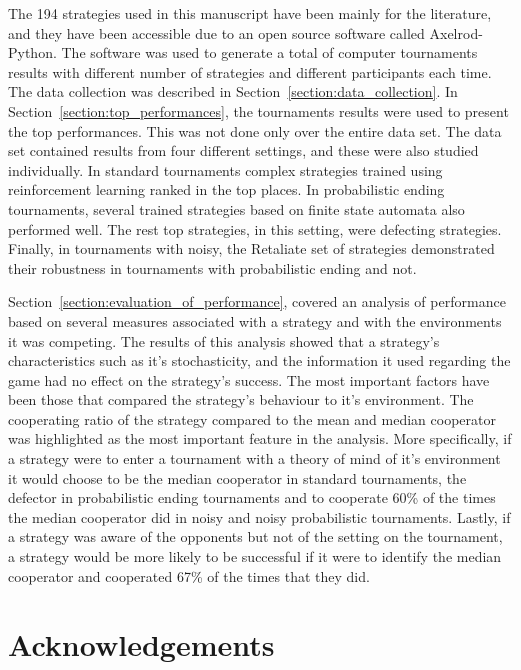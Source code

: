 \documentclass{article}
\newcommand{\numberofalltournaments}{}
\begin{document}
The 194 strategies used in this manuscript have been mainly for the literature,
and they have been accessible due to an open source software called
Axelrod-Python. The software was used to generate a total of
\numberofalltournaments computer tournaments results with different number of
strategies and different participants each time. The data collection was
described in Section~\ref{section:data_collection}. In
Section~\ref{section:top_performances}, the tournaments results were used to
present the top performances. This was not done only over the entire data set.
The data set contained results from four different settings, and these were also
studied individually. In standard tournaments complex strategies trained using
reinforcement learning ranked in the top places. In probabilistic ending
tournaments, several trained strategies based on finite state automata also
performed well. The rest top strategies, in this setting, were defecting
strategies. Finally, in tournaments with noisy, the Retaliate set of strategies
demonstrated their robustness in tournaments with probabilistic ending and not.

Section~\ref{section:evaluation_of_performance}, covered an analysis of
performance based on several measures associated with a strategy and with the
environments it was competing. The results of this analysis showed that a
strategy's characteristics such as it's stochasticity, and the information it
used regarding the game had no effect on the strategy's success. The most
important factors have been those that compared the strategy's behaviour to it's
environment. The cooperating ratio of the strategy compared to the mean and
median cooperator was highlighted as the most important feature in the analysis.
More specifically, if a strategy were to enter a tournament with a theory of
mind of it's environment it would choose to be the median cooperator in standard
tournaments, the defector in probabilistic ending tournaments and to cooperate
60\% of the times the median cooperator did in noisy and noisy probabilistic
tournaments. Lastly, if a strategy was aware of the opponents but not of the
setting on the tournament, a strategy would be more likely to be successful if
it were to identify the median cooperator and cooperated 67\% of the times that
they did.




\section{Acknowledgements}
\end{document}
